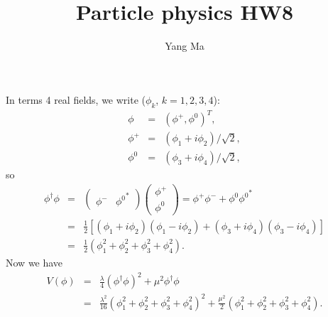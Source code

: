 \documentclass[11pt]{article}
\begin{document}
\title{Particle physics HW8}
\author{Yang Ma}

\maketitle

\section{ }
In terms 4 real fields, we write
  ($\phi_k$, $k=1,2,3,4$):
\begin{eqnarray}
  \phi &=& ( \phi^+, \phi^0 )^T,  \\
  \phi^+ &=& ( \phi_1 + i\phi_2 )/\sqrt2, \\
  \phi^0 &=& ( \phi_3 + i\phi_4 )/\sqrt2, 
\end{eqnarray}
so
\begin{eqnarray}
    \phi^\dagger \phi &=&
    \begin{pmatrix}
        \phi^- & {\phi^0}^*
    \end{pmatrix}
    \begin{pmatrix}
        \phi^+ \\ \phi^0
    \end{pmatrix}
    =\phi^+ \phi^- + \phi^0 {\phi^0}^*\\
    &=&\frac{1}{2}[( \phi_1 + i\phi_2 ) ( \phi_1 - i\phi_2 )+( \phi_3 + i\phi_4 )( \phi_3 - i\phi_4 )]\\
    &=&\frac{1}{2} ( \phi_1^2 +\phi_2^2 +\phi_3^2 +\phi_4^2).
\end{eqnarray}
Now we have
\begin{eqnarray}
    V(\phi)&=&\frac{\lambda}{4}(\phi^\dagger \phi)^2+\mu^2 \phi^\dagger \phi \\
    &=&\frac{\lambda^2}{16}(\phi_1^2+\phi_2^2+\phi_3^2+\phi_4^2)^2+\frac{\mu^2}{2}(\phi_1^2+\phi_2^2+\phi_3^2+\phi_4^2).
\end{eqnarray}
\end{document}
